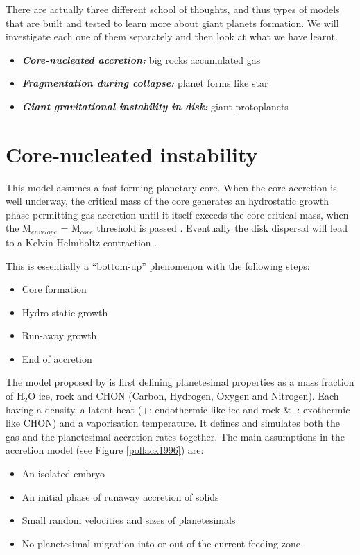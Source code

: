 \documentclass[12pt]{article} %
\begin{document}
There are actually three different school of thoughts, and thus types of models that are built and tested to learn more about giant planets formation. We will investigate each one of them separately and then look at what we have learnt.

\begin{itemize}
\setlength\itemsep{0em}  
\item \textit{\textbf{Core-nucleated accretion:}} big rocks accumulated gas 
\item \textit{\textbf{Fragmentation during collapse:}} planet forms like star
\item \textit{\textbf{Giant gravitational instability in disk:}} giant protoplanets 
\end{itemize}


\clearpage
\section{Core-nucleated instability}\vspace{-2ex}\titlerule[1pt]\bigskip

This model assumes a fast forming planetary core. When the core accretion is well underway, the critical mass of the core generates an hydrostatic growth phase permitting gas accretion until it itself exceeds the core critical mass, when the M$_{envelope}$ = M$_{core}$ threshold is passed \cite{miguel2008core}. Eventually the disk dispersal will lead to a Kelvin-Helmholtz contraction \cite{armitage2010astrophysics}. \newline\linebreak

\noindent This is essentially a ``bottom-up'' phenomenon with the following steps:
\begin{itemize}
\setlength\itemsep{0em}
\item Core formation
\item Hydro-static growth
\item Run-away growth
\item End of accretion
\end{itemize}

\noindent The model proposed by \cite{pollack1996formation} is first defining planetesimal properties as a mass fraction of H$_2$O ice, rock and CHON (Carbon, Hydrogen, Oxygen and Nitrogen). Each having a density, a latent heat (+: endothermic like ice and rock \& -: exothermic like CHON) and a vaporisation temperature. It defines and simulates both the gas and the planetesimal accretion rates together. \newline\linebreak
The main assumptions in the accretion model (see Figure \ref{pollack1996}) are: 
\begin{itemize}
\setlength\itemsep{0em}
\item An isolated embryo
\item An initial phase of runaway accretion of solids
\item Small random velocities and sizes of planetesimals
\item No planetesimal migration into or out of the current feeding zone
\end{itemize}
\end{document}
